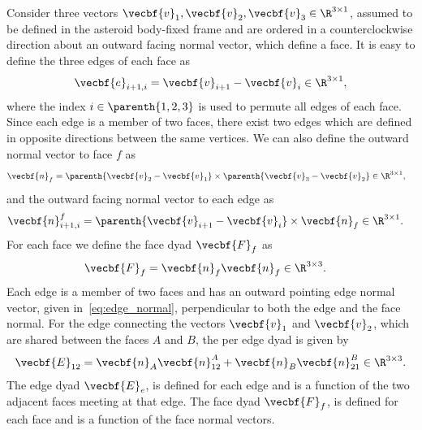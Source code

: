 \documentclass[11pt, reqno]{article}    %
\begin{document}
Consider three vectors \( \vecbf{v}_1, \vecbf{v}_2, \vecbf{v}_3 \in \R^{3 \times 1} \), assumed to be defined in the asteroid body-fixed frame and are ordered in a counterclockwise direction about an outward facing normal vector, which define a face.
It is easy to define the three edges of each face as
\begin{align}\label{eq:edges}
    \vecbf{e}_{i+1,i} = \vecbf{v}_{i+1} - \vecbf{v}_i \in \R^{3 \times 1 },
\end{align}
where the index \( i \in \parenth{1,2,3} \) is used to permute all edges of each face.
Since each edge is a member of two faces, there exist two edges which are defined in opposite directions between the same vertices.
We can also define the outward normal vector to face \( f\)  as
\begin{align}\label{eq:face_normal}
    {\vecbf{n}}_f &= \parenth{\vecbf{v}_{2} - \vecbf{v}_1} \times \parenth{\vecbf{v}_{3} - \vecbf{v}_2} \in \R^{3 \times 1},
\end{align}
and the outward facing normal vector to each edge as
\begin{align}\label{eq:edge_normal}
    {\vecbf{n}}_{i+1,i}^f &= \parenth{\vecbf{v}_{i+1} - \vecbf{v}_i} \times {\vecbf{n}}_f \in \R^{3 \times 1}.
\end{align}
For each face we define the face dyad \( \vecbf{F}_f \) as
\begin{align}\label{eq:face_dyad}
    \vecbf{F}_f &= {\vecbf{n}}_f {\vecbf{n}}_f \in \R^{3 \times 3}.
\end{align}
Each edge is a member of two faces and has an outward pointing edge normal vector, given in~\cref{eq:edge_normal}, perpendicular to both the edge and the face normal.
For the edge connecting the vectors \( \vecbf{v}_1 \) and \( \vecbf{v}_2 \), which are shared between the faces \(A\) and \( B\), the per edge dyad is given by
\begin{align}\label{eq:edge_dyad}
    \vecbf{E}_{12} = {\vecbf{n}}_A {\vecbf{n}}_{12}^A + {\vecbf{n}}_B {\vecbf{n}}_{21}^B \in \R^{3 \times 3}.
\end{align}
The edge dyad \( \vecbf{E}_e  \), is defined for each edge and is a function of the two adjacent faces meeting at that edge.
The face dyad \( \vecbf{F}_f \), is defined for each face and is a function of the face normal vectors.
\end{document}
